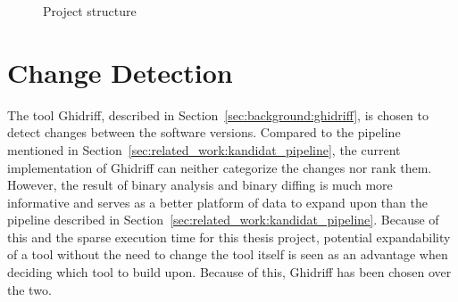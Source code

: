 \begin{figure}[H]
    \centering
    \caption{Project structure}
    \label{fig:project_structure}
\end{figure}



\section{Change Detection}

The tool Ghidriff, described in Section~\ref{sec:background:ghidriff}, is chosen to detect changes between the software versions. Compared to the pipeline mentioned in Section~\ref{sec:related_work:kandidat_pipeline}, the current implementation of Ghidriff can neither categorize the changes nor rank them. However, the result of binary analysis and binary diffing is much more informative and serves as a better platform of data to expand upon than the pipeline described in Section~\ref{sec:related_work:kandidat_pipeline}. Because of this and the sparse execution time for this thesis project, potential expandability of a tool without the need to change the tool itself is seen as an advantage when deciding which tool to build upon. Because of this, Ghidriff has been chosen over the two.

